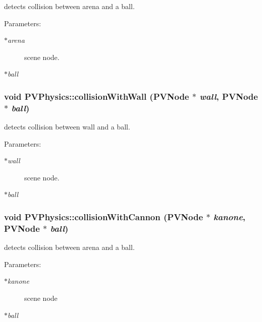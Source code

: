 detects collision between arena and a ball. 

\begin{Desc}
\item[Parameters:]
\begin{description}
\item[{\em $\ast$arena}]scene node. \item[{\em $\ast$ball}]\end{description}
\end{Desc}
\subsubsection[{collisionWithWall}]{\setlength{\rightskip}{0pt plus 5cm}void PVPhysics::collisionWithWall ({\bf PVNode} $\ast$ {\em wall}, \/  {\bf PVNode} $\ast$ {\em ball})}\label{class_p_v_physics_7e07bd0171a431a2ccf4e542348d0820}


detects collision between wall and a ball. 

\begin{Desc}
\item[Parameters:]
\begin{description}
\item[{\em $\ast$wall}]scene node. \item[{\em $\ast$ball}]\end{description}
\end{Desc}
\subsubsection[{collisionWithCannon}]{\setlength{\rightskip}{0pt plus 5cm}void PVPhysics::collisionWithCannon ({\bf PVNode} $\ast$ {\em kanone}, \/  {\bf PVNode} $\ast$ {\em ball})}\label{class_p_v_physics_967d8b19b11aef754591e6d9336ecfbe}


detects collision between arena and a ball. 

\begin{Desc}
\item[Parameters:]
\begin{description}
\item[{\em $\ast$kanone}]scene node \item[{\em $\ast$ball}]\end{description}
\end{Desc}
